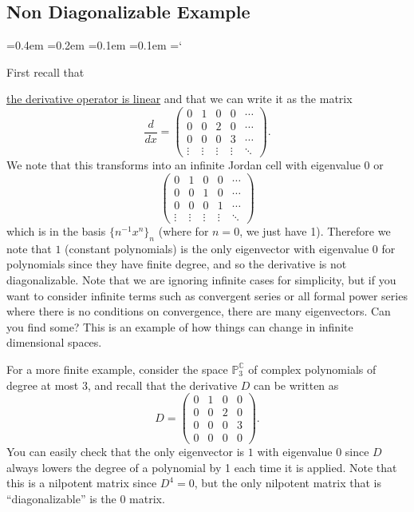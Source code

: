 
\subsection*{Non Diagonalizable Example}

{\ttfamily
{}\font=0.4em
\font=0.2em
\font=0.1em
\font=0.1em
\hyphenchar\font=`\-


\hypertarget{scripts_diagonalization_derivative}{First recall that} \hyperlink{derivative_linear}{the derivative operator is linear} and that we can write it as the matrix
\[
\frac{d}{dx} =
\begin{pmatrix}
0 & 1 & 0 & 0 & \cdots \\
0 & 0 & 2 & 0 & \cdots \\
0 & 0 & 0 & 3 & \cdots \\
\vdots & \vdots & \vdots & \vdots & \ddots
\end{pmatrix}.
\]
We note that this transforms into an infinite Jordan cell with eigenvalue 0 or
\[
\begin{pmatrix}
0 & 1 & 0 & 0 & \cdots \\
0 & 0 & 1 & 0 & \cdots \\
0 & 0 & 0 & 1 & \cdots \\
\vdots & \vdots & \vdots & \vdots & \ddots
\end{pmatrix}
\]
which is in the basis $\{n^{-1} x^n \}_n$ (where for $n = 0$, we just have 1). Therefore we note that $1$ (constant polynomials) is the only eigenvector with eigenvalue $0$ for polynomials since they have finite degree, and so the derivative is not diagonalizable. Note that we are ignoring infinite cases for simplicity, but if you want to consider infinite terms such as convergent series or all formal power series where there is no conditions on convergence, there are many eigenvectors. Can you find some? This is an example of how things can change in infinite dimensional spaces.

For a more finite example, consider the space $\mathbb{P}^{\mathbb{C}}_3$ of complex polynomials of degree at most 3, and recall that the derivative $D$ can be written as
\[
D = \begin{pmatrix}
0 & 1 & 0 & 0 \\
0 & 0 & 2 & 0 \\
0 & 0 & 0 & 3 \\
0 & 0 & 0 & 0
\end{pmatrix}.
\]
You can easily check that the only eigenvector is $1$ with eigenvalue $0$ since $D$ always lowers the degree of a polynomial by 1 each time it is applied. Note that this is a nilpotent matrix since $D^4 = 0$, but the only nilpotent matrix that is ``diagonalizable'' is the $0$ matrix.

} %

